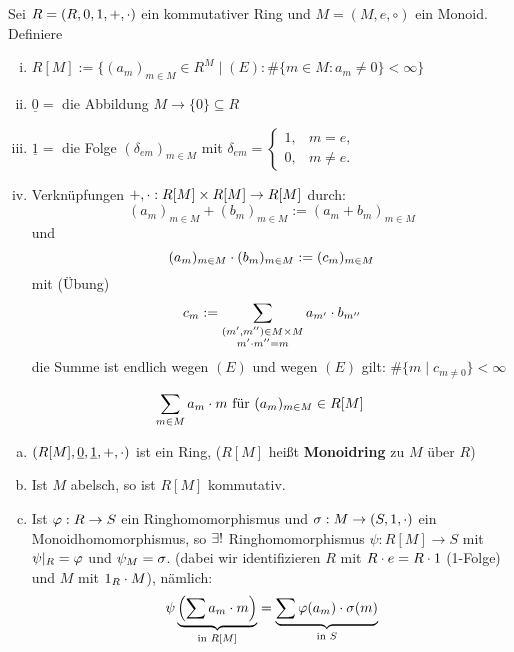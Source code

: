 \documentclass[a4paper]{report}
\begin{document}
\begin{bsp}
  Sei $R = (R, 0, 1, +, \cdot)$ ein kommutativer Ring und $M = (M, e, \circ)$ ein Monoid. Definiere
  \begin{enumerate}[(i)]
    \item $R[M] := \{(a_{m})_{m \in M} \in R^{M} \mid (E): \# \{m \in M : a_{m} \ne 0\} < \infty\}$
    \item $\underline 0 = $ die Abbildung $M \to \{0\} \subseteq R$
    \item $\underline 1 = $ die Folge $(\delta_{em})_{m \in M}$ mit $\delta_{em} = \begin{cases} 1, & m = e, \\ 0, & m \ne e.\end{cases}$
    \item Verknüpfungen $+, \cdot : R[M] \times R[M] \to R[M]$ durch:
          \[(a_{m})_{m \in M} + (b_{m})_{m \in M} := (a_{m}+b_{m})_{m \in M}\]
          und
          \[(a_{m})_{m \in M} \cdot (b_{m})_{m \in M} := (c_{m})_{m \in M}\]
          mit (Übung)
          \[c_{m}:= \sum_{\substack{(m', m'') \in M \times M \\ m' \cdot m'' = m}}a_{m'} \cdot b_{m''}\]
          die Summe ist endlich wegen $(E)$ und wegen $(E)$ gilt: $\#\{m \mid c_{m \ne 0}\} < \infty$
  \end{enumerate}
\end{bsp}

\begin{nota*}
\[\sum_{m \in M}a_{m} \cdot m \text{ für } (a_{m})_{m \in M} \in R[M]\]
\end{nota*}

\begin{ubng}\item
\begin{enumerate}[(a)]
  \item $(R[M], \underline 0, \underline 1, +, \cdot)$ ist ein Ring, ($R[M]$ heißt \textbf{Monoidring} zu $M$ über $R$)
  \item Ist $M$ abelsch, so ist $R[M]$  kommutativ.
  \item Ist $\varphi: R \to S$ ein Ringhomomorphismus und $\sigma : M \to (S, 1, \cdot)$ ein Monoidhomomorphismus, so $\exists !$ Ringhomomorphismus $\psi : R[M] \to S$ mit $\psi|_{R} = \varphi$ und $\psi_{M} = \sigma$. (dabei wir identifizieren $R$ mit $R \cdot e = R \cdot 1$ (1-Folge) und $M$ mit $1_{R} \cdot M$), nämlich:
        \[\psi\underbrace{\left(\sum a_{m}\cdot m\right)}_{\text{in }R[M]} = \underbrace{\sum \varphi(a_{m})\cdot \sigma(m)}_{\text{in } S}\]
\end{enumerate}
\end{ubng}
\end{document}
